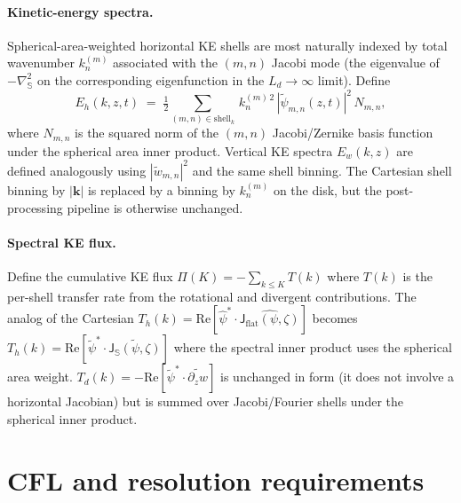 \documentclass[11pt]{article}
\newcommand{\Lapsphere}{\nabla^2_{\!\mathbb{S}}}
\newcommand{\Jflat}{\mathsf{J}_{\mathrm{flat}}}
\newcommand{\Jsphere}{\mathsf{J}_{\mathbb{S}}}
\newcommand{\Ld}{L_d}
\begin{document}
\paragraph{Kinetic-energy spectra.}  Spherical-area-weighted
horizontal KE shells are most naturally indexed by total wavenumber
$k_{n}^{(m)}$ associated with the $(m, n)$ Jacobi mode (the
eigenvalue of $-\Lapsphere$ on the corresponding eigenfunction in
the $\Ld \to \infty$ limit).  Define
\begin{equation}
  E_{h}(k, z, t)
  \;=\; \tfrac{1}{2}\sum_{(m, n) \in \mathrm{shell}_{k}}
  \,k_{n}^{(m)\,2}\,|\widetilde{\psi}_{m, n}(z, t)|^{2}\,N_{m,n},
\end{equation}
where $N_{m,n}$ is the squared norm of the $(m, n)$ Jacobi/Zernike
basis function under the spherical area inner product.  Vertical KE
spectra $E_{w}(k, z)$ are defined analogously using
$|\widetilde{w}_{m, n}|^{2}$ and the same shell binning.  The
Cartesian shell binning by $|\bm{k}|$ is replaced by a binning by
$k_{n}^{(m)}$ on the disk, but the post-processing pipeline is
otherwise unchanged.

\paragraph{Spectral KE flux.}  Define the cumulative KE flux
$\Pi(K) = -\sum_{k \le K} T(k)$ where $T(k)$ is the per-shell
transfer rate from the rotational and divergent contributions.  The
analog of the Cartesian $T_{h}(k) = \mathrm{Re}[\widehat{\psi}^{*}
\cdot \widehat{\Jflat(\psi, \zeta)}]$ becomes
$T_{h}(k) = \mathrm{Re}[\widetilde{\psi}^{*} \cdot
\widetilde{\Jsphere(\psi, \zeta)}]$ where the spectral inner product
uses the spherical area weight.  $T_{d}(k) = -\mathrm{Re}[
\widetilde{\psi}^{*} \cdot \widetilde{\partial_{z}w}]$ is unchanged
in form (it does not involve a horizontal Jacobian) but is summed
over Jacobi/Fourier shells under the spherical inner product.

\section{CFL and resolution requirements}
\end{document}
